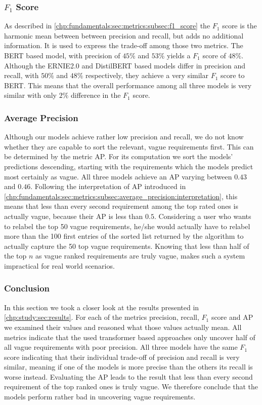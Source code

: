 \subsubsection{$F_1$ Score}
\label{chp:study:sec:interpretation:subsec:discussion:f1_score}
As described in \cref{chp:fundamentals:sec:metrics:subsec:f1_score} the $F_1$ score is the harmonic mean between between precision and recall, but adds no additional information.
It is used to express the trade-off among those two metrics.
The \ac{BERT} based model, with precision of $45\%$ and $53\%$ yields a $F_1$ score of $48\%$.
Although the \ac{ERNIE2.0} and \ac{DistilBERT} based models differ in precision and recall, with $50\%$ and $48\%$ respectively, they achieve a very similar $F_1$ score to \ac{BERT}.
This means that the overall performance among all three models is very similar with only $2\%$ difference in the $F_1$ score.

\subsubsection{Average Precision}
\label{chp:study:sec:interpretation:subsec:discussion:average_precision}
Although our models achieve rather low precision and recall, we do not know whether they are capable to sort the relevant, vague requirements first.
This can be determined by the metric \ac{AP}.
For its computation we sort the models' predictions descending, starting with the requirements which the models predict most certainly as vague.
All three models achieve an \ac{AP} varying between $0.43$ and $0.46$.
Following the interpretation of \ac{AP} introduced in \cref{chp:fundamentals:sec:metrics:subsec:average_precision:interpretation}, this means that less than every second requirement among the top rated ones is actually vague, because their \ac{AP} is less than $0.5$.
Considering a user who wants to relabel the top 50 vague requirements, he/she would actually have to relabel more than the 100 first entries of the sorted list returned by the algorithm to actually capture the 50 top vague requirements.
Knowing that less than half of the top $n$ as vague ranked requirements are truly vague, makes such a system impractical for real world scenarios.

\subsubsection{Conclusion}
\label{chp:study:sec:interpretation:subsec:discussion:usability}
In this section we took a closer look at the results presented in \cref{chp:study:sec:results}.
For each of the metrics precision, recall, $F_1$ score and \ac{AP} we examined their values and reasoned what those values actually mean.
All metrics indicate that the used transformer based approaches only uncover half of all vague requirements with poor precision.
All three models have the same $F_1$ score indicating that their individual trade-off of precision and recall is very similar, meaning if one of the models is more precise than the others its recall is worse instead.
Evaluating the \ac{AP} leads to the result that less than every second requirement of the top ranked ones is truly vague.
We therefore conclude that the models perform rather bad in uncovering vague requirements.
